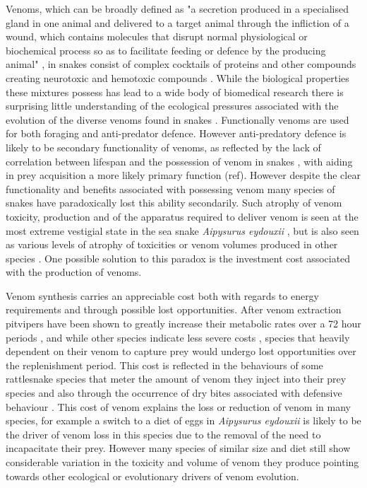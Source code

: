 Venoms, which can be broadly defined as "a secretion produced in a specialised gland in one animal and delivered to a target animal through the infliction of a wound, which contains molecules that disrupt normal physiological or biochemical process so as to facilitate feeding or defence by the producing animal" \citep{casewell2013complex}, in snakes consist of complex cocktails of proteins and other compounds creating neurotoxic and hemotoxic compounds \citep{greene1997snakes,casewell2013complex}. While the biological properties these mixtures possess has lead to a wide body of biomedical research there is surprising little understanding of the ecological pressures associated with the evolution of the diverse venoms found in snakes \citep{greene1997snakes,casewell2013complex}. Functionally venoms are used for both foraging and anti-predator defence. However anti-predatory defence is likely to be secondary functionality of venoms, as reflected by the lack of correlation between lifespan and the possession of venom in snakes \citep{hossie2013species}, with aiding in prey acquisition a more likely primary function (ref). However despite the clear functionality and benefits associated with possessing venom many species of snakes have paradoxically lost this ability secondarily. Such atrophy of venom toxicity, production and of the apparatus required to deliver venom is seen at the most extreme vestigial state in the sea snake \textit{Aipysurus eydouxii} \citep{li2005eggs}, but is also seen as various levels of atrophy of toxicities or venom volumes produced in other species \citep{fry2012structural}. One possible solution to this paradox is the investment cost associated with the production of venoms.


Venom synthesis carries an appreciable cost both with regards to energy requirements and through possible lost opportunities. After venom extraction pitvipers have been shown to greatly increase their metabolic rates over a 72 hour periods \cite{mccue2006cost}, and while other species indicate less severe costs \citep{pintor2010costs}, species that heavily dependent on their venom to capture prey would undergo lost opportunities over the replenishment period. This cost is reflected in the behaviours of some rattlesnake species that meter the amount of venom they inject into their prey species \citep{hayes1995venom} and also through the occurrence of dry bites associated with defensive behaviour \citep{morgenstern2013venom}. This cost of venom explains the loss or reduction of venom in many species, for example a switch to a diet of eggs in \textit{Aipysurus eydouxii} is likely to be the driver of venom loss in this species due to the removal of the need to incapacitate their prey. However many species of similar size and diet still show considerable variation in the toxicity and volume of venom they produce pointing towards other ecological or evolutionary drivers of venom evolution.



